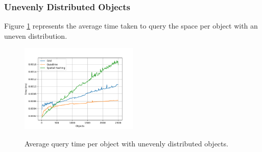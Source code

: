 \documentclass[a4paper, 12pt]{article}
\begin{document}
\subsubsection{Unevenly Distributed Objects}
Figure \ref{fig:uneven-query} represents the average time taken to query the space
per object with an uneven distribution.
\begin{figure}[h]
    \centering
    \caption{Average query time per object with unevenly distributed objects.}
    \includegraphics[width=0.5\textwidth]{uneven-query.png}
    \label{fig:uneven-query}
\end{figure}
\end{document}
